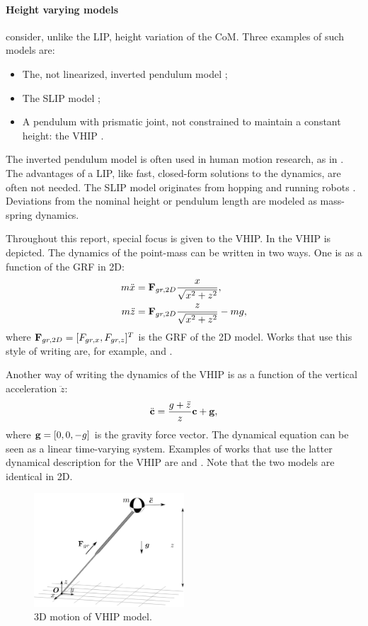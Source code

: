 \paragraph{Height varying models} consider, unlike the \ac{LIP}, height variation of the \ac{CoM}. Three examples of such models are:
\begin{itemize}
	\item The, not linearized, inverted pendulum model \cite{kuo2005energetic};
	\item The \ac{SLIP} model \cite{liu2015trajectory};
	\item A pendulum with prismatic joint, not constrained to maintain a constant height: the \ac{VHIP} \cite{pratt2007derivation}.
\end{itemize}
The inverted pendulum model is often used in human motion research, as in \cite{kuo2005energetic}. The advantages of a \ac{LIP}, like fast, closed-form solutions to the dynamics, are often not needed. The \ac{SLIP} model originates from hopping and running robots \cite{schwind1998spring}. Deviations from the nominal height or pendulum length are modeled as mass-spring dynamics. 

Throughout this report, special focus is given to the \ac{VHIP}. In  the \ac{VHIP} is depicted. The dynamics of the point-mass can be written in two ways. One is as a function of the \ac{GRF} in \ac{2D}:
\begin{align}
	m\ddot{x} &= \mathbf{F}_{gr,2D}\frac{x}{\sqrt{x^2 + z^2}},\\
	m\ddot{z} &= \mathbf{F}_{gr,2D}\frac{z}{\sqrt{x^2 + z^2}} - mg,
	\label{eq:dynamicsprattstyle}
\end{align}
where $\mathbf{F}_{gr,2D}=[F_{gr,x}, F_{gr,z}]^T$ is the \ac{GRF} of the \ac{2D}  model. Works that use this style of writing are, for example, \cite{pratt2007derivation} and \cite{koolen2016balance}.

Another way of writing the dynamics of the \ac{VHIP} is as a function of the vertical acceleration $\ddot{z}$:
\begin{equation}
	\ddot{\mathbf{c}} = \frac{g+\ddot{z}}{z}\mathbf{c} + \mathbf{g},
	\label{eq:dynamicscaronstyle}
\end{equation}
where $\mathbf{g}=[0,0,-g]$ is the gravity force vector. The dynamical equation can be seen as a linear time-varying system. Examples of works that use the latter dynamical description for the \ac{VHIP} are \cite{hopkins2014humanoid} and \cite{caron2018balance}. Note that the two models are identical in \ac{2D}.
\begin{figure}
\centering
\includegraphics[width=0.5\textwidth]{STYLESTUFF/3DCoMwithoutfootVHIP.png}
\caption{\ac{3D} motion of \ac{VHIP} model.}
\label{fig:3dvhip}
\end{figure}

